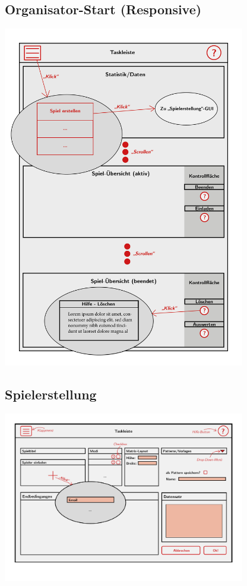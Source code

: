 \documentclass[a4paper]{scrreprt}
\begin{document}
    \subsection{Organisator-Start (Responsive)}
    \centering
    \includegraphics[width=400px]{../pictures/3_Organisator(responsive).jpg}

    \subsection{Spielerstellung}
    \centering
    \includegraphics[width=400px]{../pictures/6_Spiel.jpg}
\end{document}
